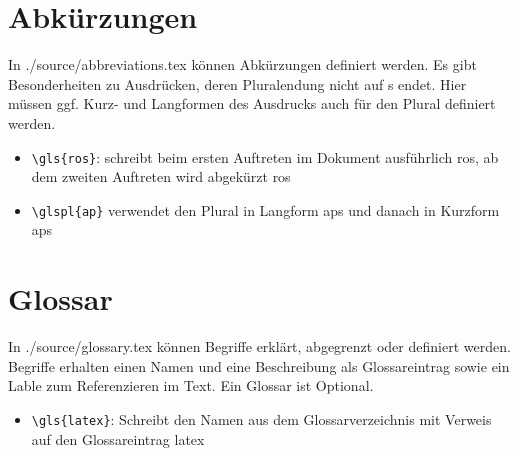 \section{Abkürzungen}
In {./source/abbreviations.tex} können Abkürzungen definiert werden. Es gibt Besonderheiten zu Ausdrücken, deren Pluralendung nicht auf s endet. Hier müssen ggf. Kurz- und Langformen des Ausdrucks auch für den Plural definiert werden.\par%
\begin{itemize}
	\item \verb|\gls{ros}|: schreibt beim ersten Auftreten im Dokument ausführlich \gls{ros}, ab dem zweiten Auftreten wird abgekürzt \gls{ros}%
	\item \verb|\glspl{ap}| verwendet den Plural in Langform \glspl{ap} und danach in Kurzform \glspl{ap}%
\end{itemize}%
%
\section{Glossar}
In {./source/glossary.tex} können Begriffe erklärt, abgegrenzt oder definiert werden. Begriffe erhalten einen Namen und eine Beschreibung als Glossareintrag sowie ein Lable zum Referenzieren im Text. Ein Glossar ist Optional.\par%
\begin{itemize}%
	\item \verb|\gls{latex}|: Schreibt den Namen aus dem Glossarverzeichnis mit Verweis auf den Glossareintrag \gls{latex}%
\end{itemize}%
%
